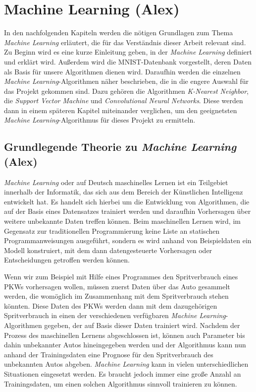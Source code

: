 \section{Machine Learning (Alex)} \label{sec:machinelearning}
In den nachfolgenden Kapiteln werden die nötigen Grundlagen zum Thema \textit{Machine Learning} erläutert, die für das Verständnis dieser Arbeit relevant sind.
Zu Beginn wird es eine kurze Einleitung geben, in der \textit{Machine Learning} definiert und erklärt wird. Außerdem wird die MNIST-Datenbank vorgestellt, deren
Daten als Basis für unsere Algorithmen dienen wird. Daraufhin werden die einzelnen \textit{Machine Learning}-Algorithmen näher beschrieben, die in die engere
Auswahl für das Projekt gekommen sind. Dazu gehören die Algorithmen \textit{K-Nearest Neighbor}, die \textit{Support Vector Machine} und \textit{Convolutional
Neural Networks}. Diese werden dann in einem späteren Kapitel miteinander verglichen, um den geeignetsten \textit{Machine Learning}-Algorithmus 
für dieses Projekt zu ermitteln.

\subsection{Grundlegende Theorie zu \textit{Machine Learning} (Alex)}
\textit{Machine Learning} oder auf Deutsch maschinelles Lernen ist ein Teilgebiet innerhalb der Informatik, das sich aus dem Bereich der Künstlichen Intelligenz
entwickelt hat. Es handelt sich hierbei um die Entwicklung von Algorithmen, die auf der Basis eines Datensatzes trainiert werden und daraufhin Vorhersagen über
weitere unbekannte Daten treffen können. Beim maschinellen Lernen wird, im Gegensatz zur traditionellen Programmierung keine Liste an statischen Programmanweisungen
ausgeführt, sondern es wird anhand von Beispieldaten ein Modell konstruiert, mit dem dann datengesteuerte Vorhersagen oder Entscheidungen getroffen werden
können.\cite{simon_2015}

Wenn wir zum Beispiel mit Hilfe eines Programmes den Spritverbrauch eines PKWs vorhersagen wollen, müssen zuerst Daten über das Auto gesammelt werden, die womöglich
im Zusammenhang mit dem Spritverbrauch stehen könnten. Diese Daten des PKWs werden dann mit dem dazugehörigen Spritverbrauch in einen der verschiedenen verfügbaren 
\textit{Machine Learning}-Algorithmen gegeben, der auf Basis dieser Daten trainiert wird. 
Nachdem der Prozess des maschinellen Lernens abgeschlossen ist, können auch Parameter bis dahin unbekannter Autos hineingegeben werden und der Algorithmus kann nun
anhand der Trainingsdaten eine Prognose für den Spritverbrauch des unbekannten Autos abgeben.
\textit{Machine Learning} kann in vielen unterschiedlichen Situationen eingesetzt werden. Es braucht jedoch immer eine große Anzahl an Trainingsdaten, um einen
solchen Algorithmus sinnvoll trainieren zu können.


